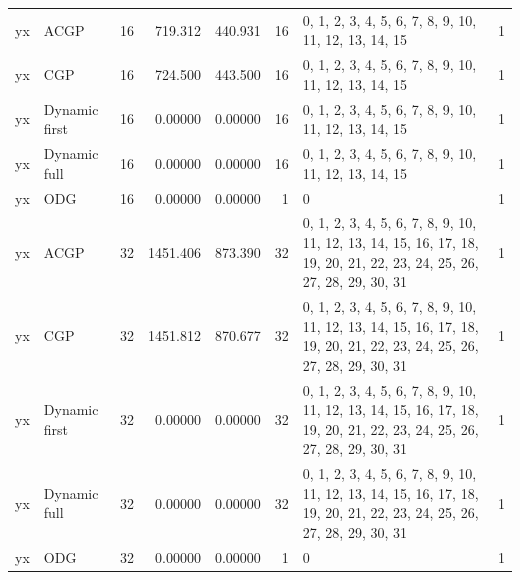 \documentclass[10pt,a4paper]{article}
\begin{document}
\begin{longtable}{@{}p{23mm}p{29mm}rrrrp{36mm}r@{}}
yx & ACGP & 16 & 719.312 & 440.931 & 16 & 0, 1, 2, 3, 4, 5, 6, 7, 8, 9, 10, 11, 12, 13, 14, 15 & 1 \\
yx & CGP & 16 & 724.500 & 443.500 & 16 & 0, 1, 2, 3, 4, 5, 6, 7, 8, 9, 10, 11, 12, 13, 14, 15 & 1 \\
yx & Dynamic first & 16 & 0.00000 & 0.00000 & 16 & 0, 1, 2, 3, 4, 5, 6, 7, 8, 9, 10, 11, 12, 13, 14, 15 & 1 \\
yx & Dynamic full & 16 & 0.00000 & 0.00000 & 16 & 0, 1, 2, 3, 4, 5, 6, 7, 8, 9, 10, 11, 12, 13, 14, 15 & 1 \\
yx & ODG & 16 & 0.00000 & 0.00000 & 1 & 0 & 1 \\
yx & ACGP & 32 & 1451.406 & 873.390 & 32 & 0, 1, 2, 3, 4, 5, 6, 7, 8, 9, 10, 11, 12, 13, 14, 15, 16, 17, 18, 19, 20, 21, 22, 23, 24, 25, 26, 27, 28, 29, 30, 31 & 1 \\
yx & CGP & 32 & 1451.812 & 870.677 & 32 & 0, 1, 2, 3, 4, 5, 6, 7, 8, 9, 10, 11, 12, 13, 14, 15, 16, 17, 18, 19, 20, 21, 22, 23, 24, 25, 26, 27, 28, 29, 30, 31 & 1 \\
yx & Dynamic first & 32 & 0.00000 & 0.00000 & 32 & 0, 1, 2, 3, 4, 5, 6, 7, 8, 9, 10, 11, 12, 13, 14, 15, 16, 17, 18, 19, 20, 21, 22, 23, 24, 25, 26, 27, 28, 29, 30, 31 & 1 \\
yx & Dynamic full & 32 & 0.00000 & 0.00000 & 32 & 0, 1, 2, 3, 4, 5, 6, 7, 8, 9, 10, 11, 12, 13, 14, 15, 16, 17, 18, 19, 20, 21, 22, 23, 24, 25, 26, 27, 28, 29, 30, 31 & 1 \\
yx & ODG & 32 & 0.00000 & 0.00000 & 1 & 0 & 1 \\
\end{longtable}\normalsize\setlength{\tabcolsep}{6pt}
\clearpage
\end{document}
